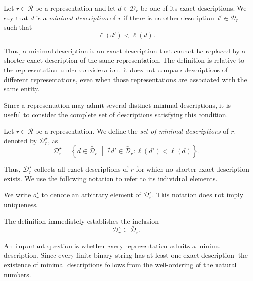 \begin{definition}
\label{def:descriptions_perfect_model}
Let $r\in\mathcal{R}$ be a representation and let $d\in\bar{\mathcal{D}}_r$ be one of its exact descriptions. We say that $d$ is a \emph{minimal description} of $r$ if there is no other description $d'\in\bar{\mathcal{D}}_r$ such that
\[
\ell(d')<\ell(d).
\]
\end{definition}

Thus, a minimal description is an exact description that cannot be replaced by a shorter exact description of the same representation. The definition is relative to the representation under consideration: it does not compare descriptions of different representations, even when those representations are associated with the same entity.

Since a representation may admit several distinct minimal descriptions, it is useful to consider the complete set of descriptions satisfying this condition.

\begin{definition}
\label{def:set_descriptions_perfect_model}
Let $r\in\mathcal{R}$ be a representation. We define the \emph{set of minimal descriptions} of $r$, denoted by $\mathcal{D}_r^\star$, as
\[
\mathcal{D}_r^\star = \left\{d\in\bar{\mathcal{D}}_r \;\middle|\;
\nexists d'\in\bar{\mathcal{D}}_r: \ell(d')<\ell(d) \right\}.
\]
\end{definition}

Thus, $\mathcal{D}_r^\star$ collects all exact descriptions of $r$ for which no shorter exact description exists. We use the following notation to refer to its individual elements.

\begin{notation}
We write $d_r^\star$ to denote an arbitrary element of $\mathcal{D}_r^\star$. This notation does not imply uniqueness.
\end{notation}

The definition immediately establishes the inclusion
\[
\mathcal{D}_r^\star\subseteq\bar{\mathcal{D}}_r.
\]

An important question is whether every representation admits a minimal description. Since every finite binary string has at least one exact description, the existence of minimal descriptions follows from the well-ordering of the natural numbers.

